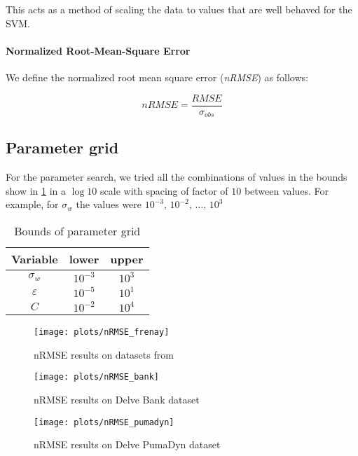 This acts as a method of scaling the data to values that are well behaved
for the SVM.

\paragraph{Normalized Root-Mean-Square Error} We define the
normalized root mean square error (\emph{nRMSE}) as follows:

\begin{equation}
    nRMSE = \frac{RMSE}{\sigma_{obs}}
\end{equation}

\subsection{Parameter grid}

For the parameter search, we tried all the combinations of values
in the bounds show in \cref{tab:paramgrid} in a $\log 10$ scale with
spacing of factor of $10$ between values. For example, for $\sigma_w$ the values
were $10^{-3},\,10^{-2},\,\dots,\,10^{3}$

\begin{table}[H]
    \caption{Bounds of parameter grid}%
    \label{tab:paramgrid}
    \begin{tabular}{ccc}
        \toprule
        Variable & lower & upper \\
        \midrule
        $\sigma_w$ & $10^{-3}$ & $10^3$ \\
        $\varepsilon$ & $10^{-5}$ & $10^1$ \\
        $C$ & $10^{-2}$ & $10^4$ \\
        \bottomrule
    \end{tabular}
\end{table}

\begin{figure}
    \texttt{[image: plots/nRMSE\_frenay]}
    \caption{nRMSE results on datasets from \cite{frenayParameterinsensitiveKernelExtreme2011}}
\end{figure}

\begin{figure}
    \texttt{[image: plots/nRMSE\_bank]}
    \caption{nRMSE results on Delve Bank dataset}
\end{figure}

\begin{figure}
    \texttt{[image: plots/nRMSE\_pumadyn]}
    \caption{nRMSE results on Delve PumaDyn dataset}
\end{figure}

